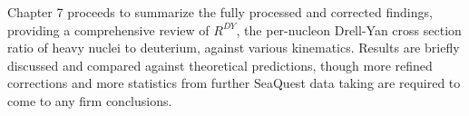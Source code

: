\documentclass[edeposit,fullpage]{uiucthesis2009}
\begin{document}
Chapter 7 proceeds to summarize the fully processed and corrected findings, providing a comprehensive review of $R^{DY}$, the per-nucleon Drell-Yan cross section ratio of heavy nuclei to deuterium, against various kinematics. Results are briefly discussed and compared against theoretical predictions, though more refined corrections and more statistics from further SeaQuest data taking are required to come to any firm conclusions.








%


\appendix

%

\backmatter



\end{document}

